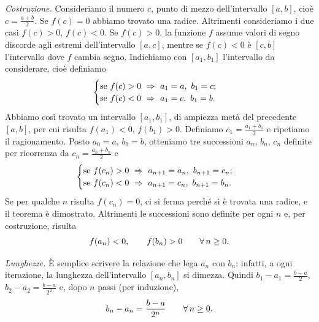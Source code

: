 \begin{dimostrazione}
\emph{Costruzione.} Consideriamo il numero $c$, punto di mezzo dell'intervallo $[a,b]$,
cioè $c=\frac{a+b}2$. Se $f(c)=0$ abbiamo trovato una radice. Altrimenti consideriamo i
due casi $f(c)>0$, $f(c)<0$. Se $f(c)>0$, la funzione $f$ assume valori di segno discorde
agli estremi dell'intervallo $[a,c]$, mentre se $f(c)<0$ è $[c,b]$ l'intervallo dove $f$
cambia segno. Indichiamo con $[a_{1},b_{1}]$ l'intervallo da considerare, cioè definiamo
\begin{equation}\label{eq:bisezione-primo}
  \begin{cases}
    \text{se } f(c)>0 \ \Rightarrow\ a_{1}=a,\ b_{1}=c;\\
    \text{se } f(c)<0 \ \Rightarrow\ a_{1}=c,\ b_{1}=b.
  \end{cases}
\end{equation}
Abbiamo così trovato un intervallo $[a_{1},b_{1}]$, di ampiezza metà del precedente
$[a,b]$, per cui risulta $f(a_{1})<0$, $f(b_{1})>0$. Definiamo $c_{1}=\frac{a_{1}+b_{1}}2$ e
ripetiamo il ragionamento. Posto $a_{0}=a$, $b_{0}=b$, otteniamo tre successioni $a_{n}$,
$b_{n}$, $c_{n}$ definite per ricorrenza da $c_{n}=\frac{a_{n}+b_{n}}2$ e
\begin{equation}\label{eq:bisezione-ricorrenza}
  \begin{cases}
    \text{se } f(c_{n})>0 \ \implica\ a_{n+1}=a_{n},\ b_{n+1}=c_{n};\\
    \text{se } f(c_{n})<0 \ \implica\ a_{n+1}=c_{n},\ b_{n+1}=b_{n}.
  \end{cases}
\end{equation}
Se per qualche $n$ risulta $f(c_{n})=0$, ci si ferma perché si è trovata una radice, e
il teorema è dimostrato. Altrimenti le successioni sono definite per ogni $n$ e, per
costruzione, risulta
\begin{equation}\label{eq:bisezione-segni}
  f(a_{n})<0, \qquad f(b_{n})>0 \qquad\forall\, n\ge0 .
\end{equation}

\emph{Lunghezze.} È semplice scrivere la relazione che lega $a_{n}$ con $b_{n}$: infatti,
a ogni iterazione, la lunghezza dell'intervallo $[a_{n},b_{n}]$ si dimezza. Quindi
$b_{1}-a_{1}=\frac{b-a}2$, $b_{2}-a_{2}=\frac{b-a}{2^{2}}$ e, dopo $n$ passi (per
induzione),
\begin{equation}\label{eq:bisezione-lunghezza}
  b_{n}-a_{n}=\frac{b-a}{2^{n}} \qquad\forall\, n\ge0 .
\end{equation}


\end{dimostrazione}
